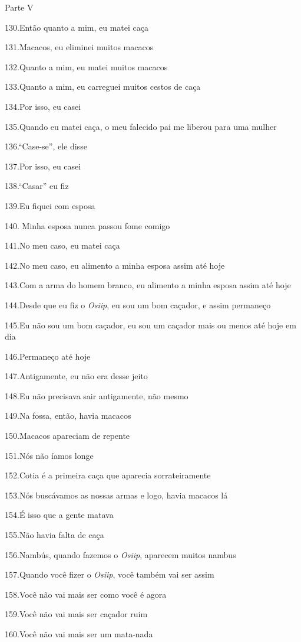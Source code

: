 Parte V

130.Então quanto a mim, eu matei caça

131.Macacos, eu eliminei muitos macacos

132.Quanto a mim, eu matei muitos macacos

133.Quanto a mim, eu carreguei muitos cestos de caça

134.Por isso, eu casei

135.Quando eu matei caça, o meu falecido pai me liberou para uma mulher

136.``Case-se'', ele disse

137.Por isso, eu casei

138.``Casar'' eu fiz

139.Eu fiquei com esposa

140. Minha esposa nunca passou fome comigo

141.No meu caso, eu matei caça

142.No meu caso, eu alimento a minha esposa assim até hoje

143.Com a arma do homem branco, eu alimento a minha esposa assim até
hoje

144.Desde que eu fiz o \emph{Osiip}, eu sou um bom caçador, e assim
permaneço

145.Eu não sou um bom caçador, eu sou um caçador mais ou menos até hoje
em dia

146.Permaneço até hoje

147.Antigamente, eu não era desse jeito

148.Eu não precisava sair antigamente, não mesmo

149.Na fossa, então, havia macacos

150.Macacos apareciam de repente

151.Nós não íamos longe

152.Cotia é a primeira caça que aparecia sorrateiramente

153.Nós buscávamos as nossas armas e logo, havia macacos lá

154.É isso que a gente matava

155.Não havia falta de caça

156.Nambús, quando fazemos o \emph{Osiip}, aparecem muitos nambus

157.Quando você fizer o \emph{Osiip}, você também vai ser assim

158.Você não vai mais ser como você é agora

159.Você não vai mais ser caçador ruim

160.Você não vai mais ser um mata-nada

